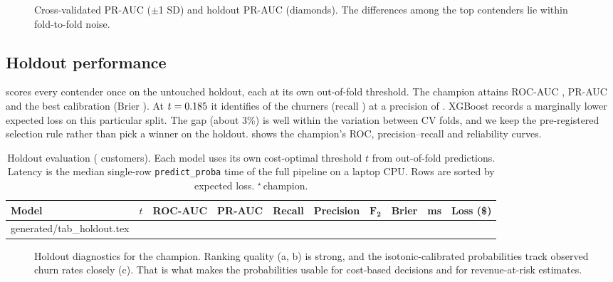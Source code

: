 \documentclass[conference]{IEEEtran}
\makeatletter
\newcommand{\genrows}[1]{\@@input generated/#1.tex }
\newcommand{\code}[1]{\texttt{#1}}
\makeatother
\begin{document}
\begin{figure}[t]
\centering

\caption{Cross-validated PR-AUC ($\pm$1 SD) and holdout PR-AUC (diamonds). The differences
among the top contenders lie within fold-to-fold noise.}
\label{fig:models}
\end{figure}

\subsection{Holdout performance}
 scores every contender once on the untouched holdout, each at its own
out-of-fold threshold. The champion attains ROC-AUC \HoldoutROC{}, PR-AUC \HoldoutPR{} and the
best calibration (Brier \HoldoutBrier{}). At $t=0.185$ it identifies \HoldoutTP{} of the
\HoldoutPositives{} churners (recall \HoldoutRecall{}) at a precision of \HoldoutPrecision{}.
XGBoost records a marginally lower expected loss on this particular split. The gap (about 3\%)
is well within the variation between CV folds, and we keep the pre-registered selection rule
rather than pick a winner on the holdout.  shows the champion's ROC,
precision--recall and reliability curves.

\begin{table}[t]
\centering
\caption{Holdout evaluation (\NHoldout{} customers). Each model uses its own cost-optimal
threshold $t$ from out-of-fold predictions. Latency is the median single-row
\code{predict\_proba} time of the full pipeline on a laptop CPU. Rows are sorted by expected
loss. $^\star$\,champion.}
\label{tab:holdout}
\small
\begin{tabular}{@{}l c c c c c c c r r@{}}
\toprule
\textbf{Model} & $t$ & \textbf{ROC-AUC} & \textbf{PR-AUC} & \textbf{Recall} & \textbf{Precision} & $\boldsymbol{F_2}$ & \textbf{Brier} & \textbf{ms} & \textbf{Loss (\$)}\\
\midrule
\genrows{tab_holdout}
\bottomrule
\end{tabular}
\end{table}

\begin{figure}[t]
\centering
{}\hfill
{}\hfill
{}
\caption{Holdout diagnostics for the champion. Ranking quality (a, b) is strong, and the
isotonic-calibrated probabilities track observed churn rates closely (c). That is what makes the
probabilities usable for cost-based decisions and for revenue-at-risk estimates.}
\label{fig:curves}
\end{figure}
\end{document}
